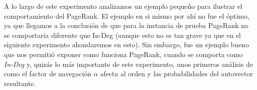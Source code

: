 \medskip
\par A lo largo de este experimento analizamos un ejemplo peque\~no para
ilustrar el comportamiento del PageRank. El ejemplo en si mismo por ah\'i no fue
el \'optimo, ya que llegamos a la conclusi\'on de que para la instancia de
prueba PageRank no se comportar\'ia diferente que In-Deg (aunque esto no es tan
grave ya que en el siguiente experimento ahondaremos en esto). Sin embargo, fue
un ejemplo bueno que nos permiti\'o exponer como funciona PageRank, cuando se
comporta como \emph{In-Deg} y, quiz\'as lo m\'as importante de este experimento,
unos primeros an\'alisis de como el factor de navegaci\'on $\alpha$ afecta al
orden y las probabilidades del autovector resultante.
